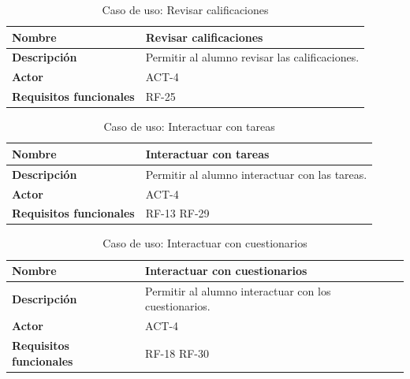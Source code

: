 \begin{table}[H]
\centering
\begin{tabularx}{\textwidth}{
  |>{\centering\arraybackslash}l
  |>{\centering\arraybackslash}X|}
\hline
\textbf{Nombre} & {\textbf{Revisar calificaciones}} \\ \hline

\textbf{Descripción} & Permitir al alumno revisar las calificaciones. \\ \hline
\textbf{Actor} & ACT-4\\ \hline
\textbf{Requisitos funcionales} & RF-25\\ \hline
\end{tabularx}
\caption{Caso de uso: Revisar calificaciones}
\end{table}
\begin{table}[H]
\centering
\begin{tabularx}{\textwidth}{
  |>{\centering\arraybackslash}l
  |>{\centering\arraybackslash}X|}
\hline
\textbf{Nombre} & {\textbf{Interactuar con tareas}} \\ \hline

\textbf{Descripción} & Permitir al alumno interactuar con las tareas. \\ \hline
\textbf{Actor} & ACT-4\\ \hline
\textbf{Requisitos funcionales} & RF-13 RF-29\\ \hline
\end{tabularx}
\caption{Caso de uso: Interactuar con tareas}
\end{table}
\begin{table}[H]
\centering
\begin{tabularx}{\textwidth}{
  |>{\centering\arraybackslash}l
  |>{\centering\arraybackslash}X|}
\hline
\textbf{Nombre} & {\textbf{Interactuar con cuestionarios}} \\ \hline

\textbf{Descripción} & Permitir al alumno interactuar con los cuestionarios. \\ \hline
\textbf{Actor} & ACT-4\\ \hline
\textbf{Requisitos funcionales} & RF-18 RF-30\\ \hline
\end{tabularx}
\caption{Caso de uso: Interactuar con cuestionarios}
\end{table}

